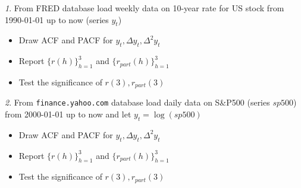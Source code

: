 \documentclass[12pt]{article}
\theoremstyle{remark}
\newtheorem{exercise}{}[section]
\begin{document}
\begin{exercise}
From FRED database load weekly data on 10-year rate  for US stock from 1990-01-01 up to now
(series \(y_t\))
\begin{itemize}
	\item Draw ACF and PACF for \(y_t, \Delta y_t, \Delta^2 y_t\)
	\item Report \(\{r(h)\}_{h=1}^3\) and \(\{r_{part}(h)\}_{h=1}^3\) 
	\item Test the significance of \(r(3),r_{part}(3)\)
\end{itemize}
\end{exercise}

\begin{exercise}
From \texttt{finance.yahoo.com} database load daily data on S\&P500 (series \(sp500\))
from 2000-01-01 up to now and let \(y_t=\log(sp500)\)
\begin{itemize}
	\item Draw ACF and PACF for \(y_t, \Delta y_t, \Delta^2 y_t\)
	\item Report \(\{r(h)\}_{h=1}^3\) and \(\{r_{part}(h)\}_{h=1}^3\) 
	\item Test the significance of \(r(3),r_{part}(3)\)
\end{itemize}
\end{exercise}
\end{document}
